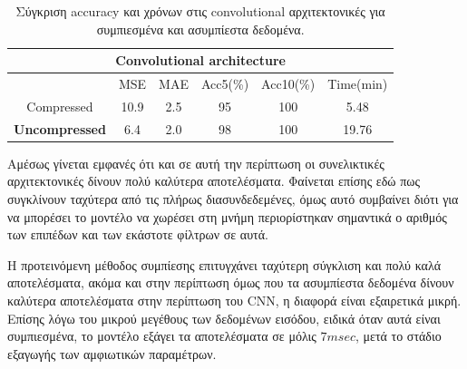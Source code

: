 \begin{table}[h!]
    \centering
    \begin{tabular}{|c|c|c|c|c|c|}
     \hline
     \multicolumn{6}{|c|}{Convolutional architecture} \\[5pt]
     \hline
      & MSE & MAE & Acc5(\%) & Acc10(\%) & Time(min) \\[5pt]
     \hline
    {\small Compressed} & 10.9 & 2.5 & 95 & 100 & 5.48 \\[5pt]
    \hline
    \textbf{{\small Uncompressed}} & 6.4 & 2.0 & 98 & 100 & 19.76 \\[5pt]
    \hline
    \end{tabular}
    \caption{Σύγκριση accuracy και χρόνων στις convolutional αρχιτεκτονικές για συμπιεσμένα και ασυμπίεστα δεδομένα.}
    \label{tab:model_comparisons5}
\end{table}{}

Αμέσως γίνεται εμφανές ότι και σε αυτή την περίπτωση οι συνελικτικές αρχιτεκτονικές δίνουν πολύ καλύτερα αποτελέσματα. Φαίνεται επίσης εδώ πως συγκλίνουν ταχύτερα από τις πλήρως διασυνδεδεμένες, όμως αυτό συμβαίνει διότι για να μπορέσει το μοντέλο να χωρέσει στη μνήμη περιορίστηκαν σημαντικά ο αριθμός των επιπέδων και των εκάστοτε φίλτρων σε αυτά.

Η προτεινόμενη μέθοδος συμπίεσης επιτυγχάνει ταχύτερη σύγκλιση και πολύ καλά αποτελέσματα, ακόμα και στην περίπτωση όμως που τα ασυμπίεστα δεδομένα δίνουν καλύτερα αποτελέσματα στην περίπτωση του CNN, η διαφορά είναι εξαιρετικά μικρή. Επίσης λόγω του μικρού μεγέθους των δεδομένων εισόδου, ειδικά όταν αυτά είναι συμπιεσμένα, το μοντέλο εξάγει τα αποτελέσματα σε μόλις $7msec$, μετά το στάδιο εξαγωγής των αμφιωτικών παραμέτρων.